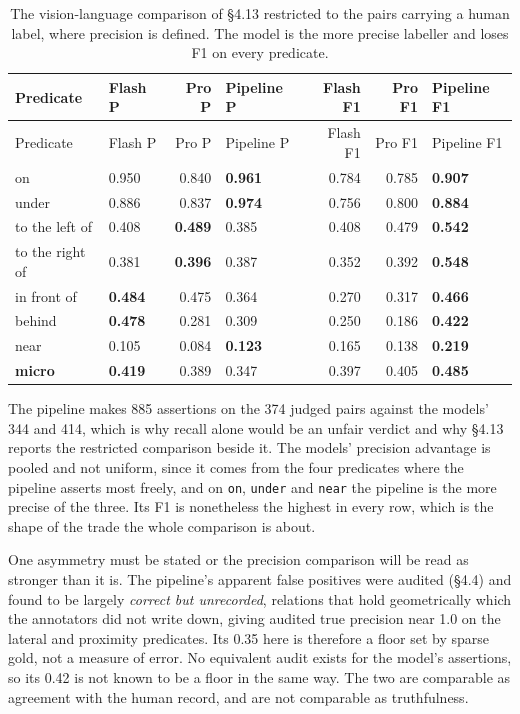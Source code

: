 \begin{center}
\setlength{\tabcolsep}{6pt}
\small
\begin{longtable}{llrlrrl}
\caption[The vision-language comparison of \S{}4.13 restricted]{The vision-language comparison of \S{}4.13 restricted to the pairs carrying a human label, where precision is defined. The model is the more precise labeller and loses F1 on every predicate.}\\
\hline
Predicate & Flash P & Pro P & Pipeline P & Flash F1 & Pro F1 & Pipeline F1 \\
\hline
\endfirsthead
\hline
Predicate & Flash P & Pro P & Pipeline P & Flash F1 & Pro F1 & Pipeline F1 \\
\hline
\endhead
on & 0.950 & 0.840 & \textbf{0.961} & 0.784 & 0.785 & \textbf{0.907} \\
under & 0.886 & 0.837 & \textbf{0.974} & 0.756 & 0.800 & \textbf{0.884} \\
to the left of & 0.408 & \textbf{0.489} & 0.385 & 0.408 & 0.479 & \textbf{0.542} \\
to the right of & 0.381 & \textbf{0.396} & 0.387 & 0.352 & 0.392 & \textbf{0.548} \\
in front of & \textbf{0.484} & 0.475 & 0.364 & 0.270 & 0.317 & \textbf{0.466} \\
behind & \textbf{0.478} & 0.281 & 0.309 & 0.250 & 0.186 & \textbf{0.422} \\
near & 0.105 & 0.084 & \textbf{0.123} & 0.165 & 0.138 & \textbf{0.219} \\
\textbf{micro} & \textbf{0.419} & 0.389 & 0.347 & 0.397 & 0.405 & \textbf{0.485} \\
\hline
\end{longtable}
\end{center}

The pipeline makes 885 assertions on the 374 judged pairs against the models' 344 and 414, which is why recall alone would be an unfair verdict and why \S{}4.13 reports the restricted comparison beside it. The models' precision advantage is pooled and not uniform, since it comes from the four predicates where the pipeline asserts most freely, and on \texttt{on}, \texttt{under} and \texttt{near} the pipeline is the more precise of the three. Its F1 is nonetheless the highest in every row, which is the shape of the trade the whole comparison is about.

One asymmetry must be stated or the precision comparison will be read as stronger than it is. The pipeline's apparent false positives were audited (\S{}4.4) and found to be largely \textit{correct but unrecorded}, relations that hold geometrically which the annotators did not write down, giving audited true precision near 1.0 on the lateral and proximity predicates. Its 0.35 here is therefore a floor set by sparse gold, not a measure of error. No equivalent audit exists for the model's assertions, so its 0.42 is not known to be a floor in the same way. The two are comparable as agreement with the human record, and are not comparable as truthfulness.

